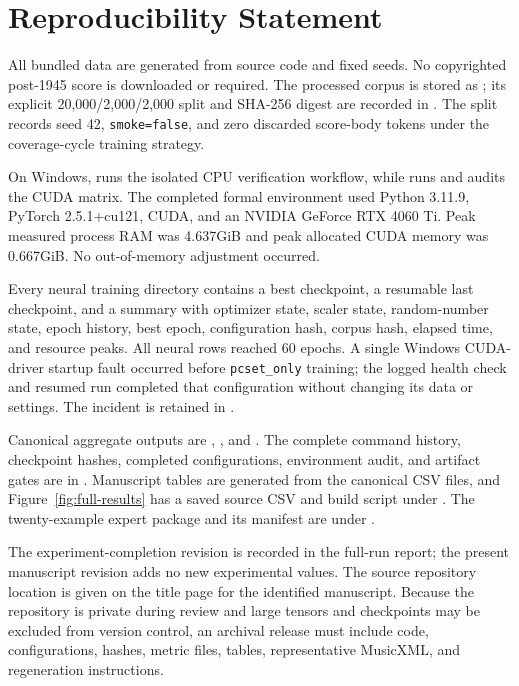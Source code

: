 \section{Reproducibility Statement}
\label{sec:reproducibility}

All bundled data are generated from source code and fixed seeds. No copyrighted post-1945 score is downloaded or required. The processed corpus is stored as ; its explicit 20,000/2,000/2,000 split and SHA-256 digest are recorded in . The split records seed 42, \texttt{smoke=false}, and zero discarded score-body tokens under the coverage-cycle training strategy.

On Windows,  runs the isolated CPU verification workflow, while  runs and audits the CUDA matrix. The completed formal environment used Python 3.11.9, PyTorch 2.5.1+cu121, CUDA, and an NVIDIA GeForce RTX 4060 Ti. Peak measured process RAM was 4.637GiB and peak allocated CUDA memory was 0.667GiB. No out-of-memory adjustment occurred.

Every neural training directory contains a best checkpoint, a resumable last checkpoint, and a summary with optimizer state, scaler state, random-number state, epoch history, best epoch, configuration hash, corpus hash, elapsed time, and resource peaks. All neural rows reached 60 epochs. A single Windows CUDA-driver startup fault occurred before \texttt{pcset\_only} training; the logged health check and resumed run completed that configuration without changing its data or settings. The incident is retained in .

Canonical aggregate outputs are , , and . The complete command history, checkpoint hashes, completed configurations, environment audit, and artifact gates are in . Manuscript tables are generated from the canonical CSV files, and Figure~\ref{fig:full-results} has a saved source CSV and build script under . The twenty-example expert package and its manifest are under .

The experiment-completion revision is recorded in the full-run report; the present manuscript revision adds no new experimental values. The source repository location is given on the title page for the identified manuscript. Because the repository is private during review and large tensors and checkpoints may be excluded from version control, an archival release must include code, configurations, hashes, metric files, tables, representative MusicXML, and regeneration instructions.
